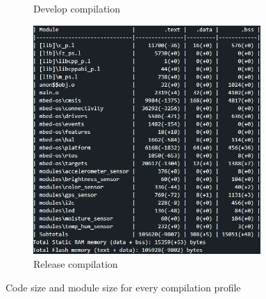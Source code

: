 \begin{figure}[H]
\begin{subfigure}[t]{0.45\textwidth}
        \caption{Develop compilation}
    \end{subfigure}
    \begin{subfigure}[t]{0.45\textwidth}
        \centering
        \includegraphics[width=0.95\textwidth]{images/8/releaseSize.png}
        \caption{Release compilation}
    \end{subfigure}
    \caption{Code size and module size for every compilation profile}
    \label{fig:compilation}
\end{figure}
\clearpage
